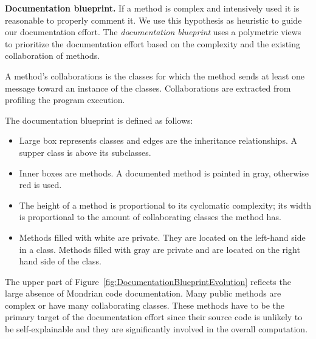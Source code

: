 \documentclass[runningheads]{llncs}
\newcommand{\sd}[1]{\nb{SD}{orange}{#1}}
\newcommand{\figref}[1]{Figure~\ref{fig:#1}}
\newcommand{\myparagraph}[1]{\noindent \textbf{#1.}}
\begin{document}

\myparagraph{Documentation blueprint}
If a method is complex and intensively used it is reasonable to properly comment it. We use this hypothesis as heuristic to guide our documentation effort. The \emph{documentation blueprint} uses a polymetric views to prioritize the documentation effort based on the complexity and the existing collaboration of methods.

A method's collaborations is the classes for which the method sends at least one message toward an instance of the classes. Collaborations are extracted from profiling the program execution.

The documentation blueprint is defined as follows:
\begin{itemize}
\item Large box represents classes and edges are the inheritance relationships. A supper class is above its subclasses.
\item Inner boxes are methods. A documented method is painted in gray, otherwise red is used.
\item The height of a method is proportional to its cyclomatic complexity; its width is proportional to the amount of collaborating classes the method has.
\item Methods filled with white are private. They are located on the left-hand side in a class. Methods filled with gray are private and are located on the right hand side of the class.
\end{itemize}

The upper part of \figref{DocumentationBlueprintEvolution} reflects the large absence of Mondrian code documentation. Many public methods are complex or have many collaborating classes. These methods have to be the primary target of the documentation effort since their source code is unlikely to be self-explainable and they are significantly involved in the overall computation. \\


%
\end{document}
